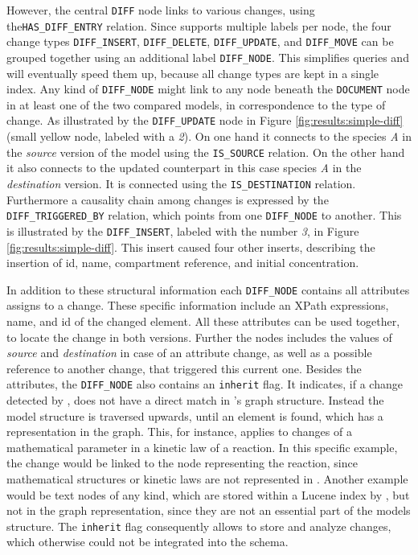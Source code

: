 However, the central \texttt{DIFF} node links to various changes, using the\linebreak \texttt{HAS\_DIFF\_ENTRY} relation. Since \neoj supports multiple labels per node, the four change types \texttt{DIFF\_INSERT}, \texttt{DIFF\_DELETE}, \texttt{DIFF\_UPDATE}, and \texttt{DIFF\_MOVE} can be grouped together using an additional label \texttt{DIFF\_NODE}. This simplifies queries and will eventually speed them up, because all change types are kept in a single index.
Any kind of \texttt{DIFF\_NODE} might link to any node beneath the \texttt{DOCUMENT} node in at least one of the two compared models, in correspondence to the type of change.
As illustrated by the \texttt{DIFF\_UPDATE} node in Figure \ref{fig:results:simple-diff} (small yellow node, labeled with a \emph{2}). On one hand it connects to the species \emph{A} in the \emph{source} version of the model using the \texttt{IS\_SOURCE} relation. On the other hand it also connects to the updated counterpart in this case species \emph{A} in the \emph{destination} version. It is connected using the \texttt{IS\_DESTINATION} relation.
Furthermore a causality chain among changes is expressed by the \texttt{DIFF\_TRIGGERED\_BY} relation, which points from one \texttt{DIFF\_NODE} to another. This is illustrated by the \texttt{DIFF\_INSERT}, labeled with the number \emph{3}, in Figure \ref{fig:results:simple-diff}. This insert caused four other inserts, describing the insertion of id, name, compartment reference, and initial concentration.

In addition to these structural information each \texttt{DIFF\_NODE} contains all attributes \bives assigns to a change. These \bives specific information include an XPath expressions, name, and id of the changed \xml element. All these attributes can be used together, to locate the change in both versions.
Further the nodes includes the values of \emph{source} and \emph{destination} in case of an attribute change, as well as a possible reference to another change, that triggered this current one.
Besides the \bives attributes, the \texttt{DIFF\_NODE} also contains an \texttt{inherit} flag. It indicates, if a change detected by \bives, does not have a direct match in \masymos's graph structure. Instead the model structure is traversed upwards, until an element is found, which has a representation in the \masymos graph.
This, for instance, applies to changes of a mathematical parameter in a kinetic law of a reaction. In this specific example, the change would be linked to the node representing the reaction, since mathematical structures or kinetic laws are not represented in \masymos. Another example would be text nodes of any kind, which are stored within a Lucene index by \masymos, but not in the graph representation, since they are not an essential part of the models structure.
The \texttt{inherit} flag consequently allows to store and analyze changes, which otherwise could not be integrated into the schema.

